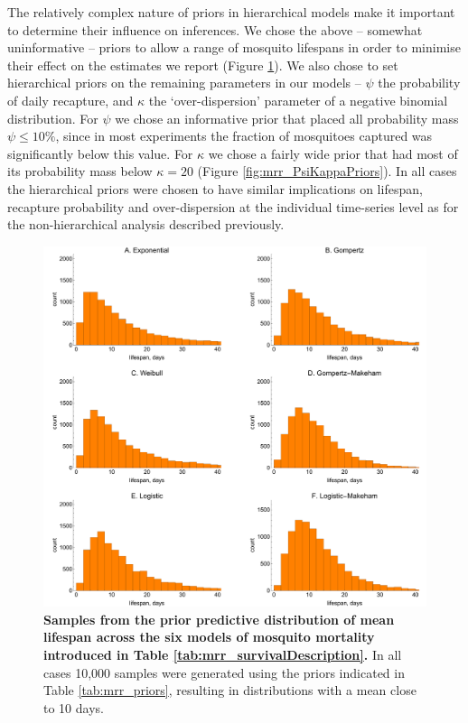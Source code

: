 \documentclass[12pt]{article}
\begin{document}
The relatively complex nature of priors in hierarchical models make it important to determine their influence on inferences. We chose the above -- somewhat uninformative -- priors to allow a range of mosquito lifespans in order to minimise their effect on the estimates we report (Figure \ref{fig:mrr_meanLifespanPrior}). We also chose to set hierarchical priors on the remaining parameters in our models -- $\psi$ the probability of daily recapture, and $\kappa$ the `over-dispersion' parameter of a negative binomial distribution. For $\psi$ we chose an informative prior that placed all probability mass $\psi\leq 10\%$, since in most experiments the fraction of mosquitoes captured was significantly below this value. For $\kappa$ we chose a fairly wide prior that had most of its probability mass below $\kappa=20$ (Figure \ref{fig:mrr_PsiKappaPriors}). In all cases the hierarchical priors were chosen to have similar implications on lifespan, recapture probability and over-dispersion at the individual time-series level as for the non-hierarchical analysis described previously.

\begin{figure}[h]
	\centerline{\includegraphics[width=1\textwidth]{./Figure_files/mrr_lifespan_priors.pdf}}
	\caption{\textbf{Samples from the prior predictive distribution of mean lifespan across the six models of mosquito mortality introduced in Table \ref{tab:mrr_survivalDescription}.} In all cases 10,000 samples were generated using the priors indicated in Table \ref{tab:mrr_priors}, resulting in distributions with a mean close to 10 days.}
	\label{fig:mrr_meanLifespanPrior}
\end{figure}
\end{document}
